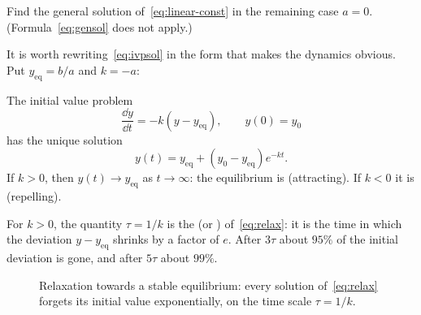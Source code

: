 \begin{exercise}
	Find the general solution of~\eqref{eq:linear-const} in the remaining case \(a = 0\).
	(Formula~\eqref{eq:gensol} does not apply.)
\end{exercise}

It is worth rewriting~\eqref{eq:ivpsol} in the form that makes the dynamics obvious. Put
\(y_{\mathrm{eq}} = b/a\) and \(k = -a\):

\begin{corollary}\label{cor:relax}
	The initial value problem
	\begin{equation}\label{eq:relax}
		\frac{\dd y}{\dd t} = -k\left( y - y_{\mathrm{eq}} \right), \qquad y(0) = y_0
	\end{equation}
	has the unique solution
	\begin{equation}\label{eq:relax-sol}
		y(t) = y_{\mathrm{eq}} + \left( y_0 - y_{\mathrm{eq}} \right) e^{-kt}.
	\end{equation}
	If \(k > 0\), then \(y(t) \to y_{\mathrm{eq}}\) as \(t \to \infty\): the equilibrium
	is  (attracting). If \(k < 0\) it is  (repelling).
\end{corollary}

\begin{definition}
	For \(k > 0\), the quantity \(\tau = 1/k\) is the  (or
	) of~\eqref{eq:relax}: it is the time in which the deviation
	\(y - y_{\mathrm{eq}}\) shrinks by a factor of \(e\). After \(3\tau\) about \(95\%\)
	of the initial deviation is gone, and after \(5\tau\) about \(99\%\).
\end{definition}

\begin{figure}[H]
	\centering
	\caption{Relaxation towards a stable equilibrium: every solution
		of~\eqref{eq:relax} forgets its initial value exponentially, on the time scale
		\(\tau = 1/k\).}
\end{figure}

